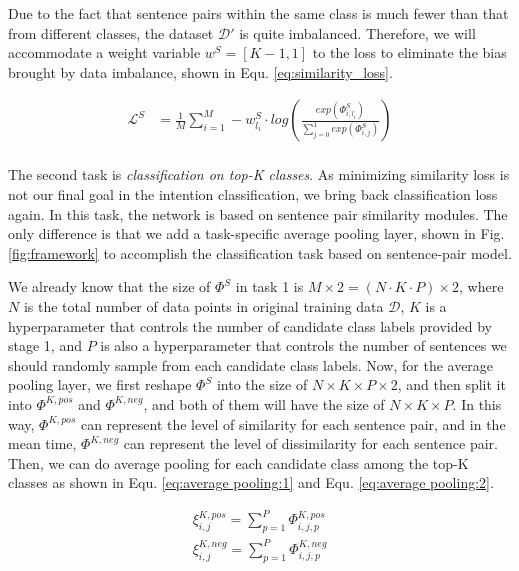 \documentclass[letterpaper]{article} %
\begin{document}
  Due  to  the  fact that sentence pairs within the same class is much fewer than
  that from  different  classes,  the  dataset  $\mathcal{D'}$  is
  quite imbalanced.  Therefore, we will accommodate a weight variable $w^S = [K-1, 1]$
  to  the  loss  to eliminate the bias brought by data imbalance, shown in Equ.
  \ref{eq:similarity_loss}.

  \begin{equation}
    \begin{aligned}
      \mathcal{L}^{S}&=\frac{1}{M}\sum_{i=1}^{M}-w^S_{l_i}\cdot log(\frac{exp(\varPhi_{i,l_{i}}^S)}{\sum_{j=0}^{1}exp(\varPhi_{i,j}^S)}) \\
      \label{eq:similarity_loss}
    \end{aligned}
  \end{equation}

  The  second  task  is  \emph{classification  on  top-K classes}. As minimizing
  similarity  loss  is  not  our  final goal in the intention classification, we
  bring  back  classification  loss again. In this task, the network is based on
  sentence  pair  similarity  modules.  The  only  difference  is  that we add a
  task-specific  average  pooling  layer,  shown  in Fig. \ref{fig:framework} to
  accomplish the classification task based on sentence-pair model.

  We  already  know  that the size of ${\Phi}^S$ in task 1 is $M\times 2=(N\cdot
  K\cdot  P)\times  2$, where $N$ is the total number of data points in original
  training  data $\mathcal{D}$, $K$ is a hyperparameter that controls the number
  of   candidate   class  labels  provided  by  stage  1,  and  $P$  is  also  a
  hyperparameter that controls the number of sentences we should randomly sample
  from each candidate class labels. Now, for the average pooling layer, we first
  reshape  ${\Phi}^S$  into  the  size  of $N\times K\times P\times 2$, and then
  split  it  into  ${\Phi}^{K,pos}$  and ${\Phi}^{K,neg}$, and both of them will
  have  the  size  of  $N\times  K\times  P$.  In this way, ${\Phi}^{K,pos}$ can
  represent  the  level  of  similarity  for each sentence pair, and in the mean
  time,  ${\Phi}^{K,neg}$  can  represent  the  level  of dissimilarity for each
  sentence  pair. Then, we can do average pooling for each candidate class among
  the  top-K  classes  as  shown  in  Equ.  \ref{eq:average  pooling:1} and Equ.
  \ref{eq:average pooling:2}.

  \begin{align}
    {\xi}_{i,j}^{K,pos} = \sum_{p=1}^{P}{\varPhi}_{i,j,p}^{K,pos} \label{eq:average pooling:1}\\
    {\xi}_{i,j}^{K,neg} = \sum_{p=1}^{P}{\varPhi}_{i,j,p}^{K,neg}
    \label{eq:average pooling:2}
  \end{align}
\end{document}
